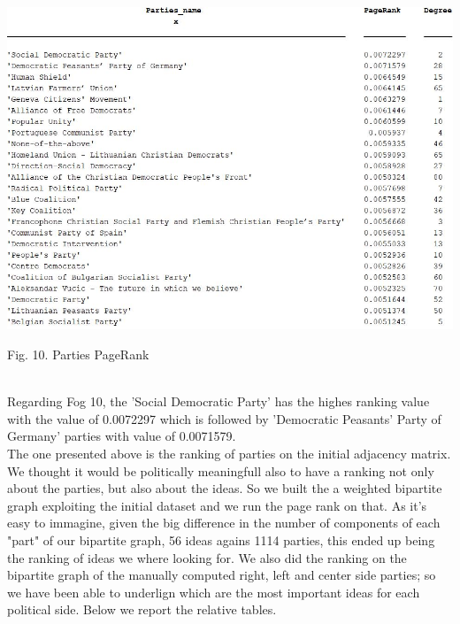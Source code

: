 \documentclass{article}%
\begin{document}
\includegraphics[scale=0.5]{Pagerank}
\begin{center}
\begin{small}
Fig. 10. Parties PageRank
\end{small}
\end{center}
~
\\

Regarding Fog 10, the 'Social Democratic Party' has the highes ranking value with the value of 0.0072297 which is followed by 'Democratic Peasants’ Party of Germany' parties with value of 0.0071579.
\\

The one presented above is the ranking of parties on the initial adjacency matrix. We thought it would be politically meaningfull also to have a ranking not only about the parties, but also about the ideas. So we built the a weighted bipartite graph exploiting the initial dataset and we run the page rank on that. As it's easy to immagine, given the big difference in the number of components of each "part" of our bipartite graph, 56 ideas agains 1114 parties, this ended up being the ranking of ideas we where looking for. We also did the ranking on the bipartite graph of the manually computed right, left and center side parties; so we have been able to underlign which are the most important ideas for each political side. Below we report the relative tables.
\\
\end{document}
